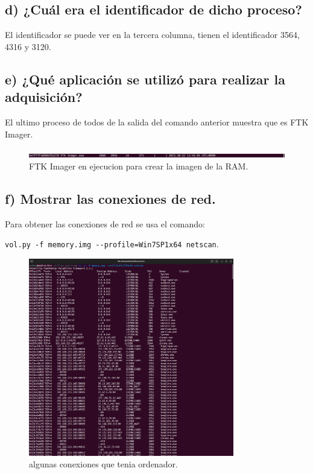 \documentclass{article}
\begin{document}
\subsection{d) ¿Cuál era el identificador de dicho proceso?}

El identificador se puede ver en la tercera columna, tienen el identificador 3564, 4316 y 3120.
\subsection{e) ¿Qué aplicación se utilizó para realizar la adquisición?}
El ultimo proceso de todos de la salida del comando anterior muestra que es FTK Imager.

\begin{figure}[H]
    \centering
    \includegraphics[width=\textwidth]{imagenes/pslist-2.png}
    \caption{FTK Imager en ejecucion para crear la imagen de la RAM.}
\end{figure}
\subsection{f) Mostrar las conexiones de red.}
Para obtener las conexiones de red se usa el comando:

\verb|vol.py -f memory.img --profile=Win7SP1x64 netscan|.

\begin{figure}[H]
    \centering
    \includegraphics[width=0.8\textwidth]{imagenes/netscan.png}
    \caption{algunas conexiones que tenia ordenador.}
\end{figure}
\end{document}
